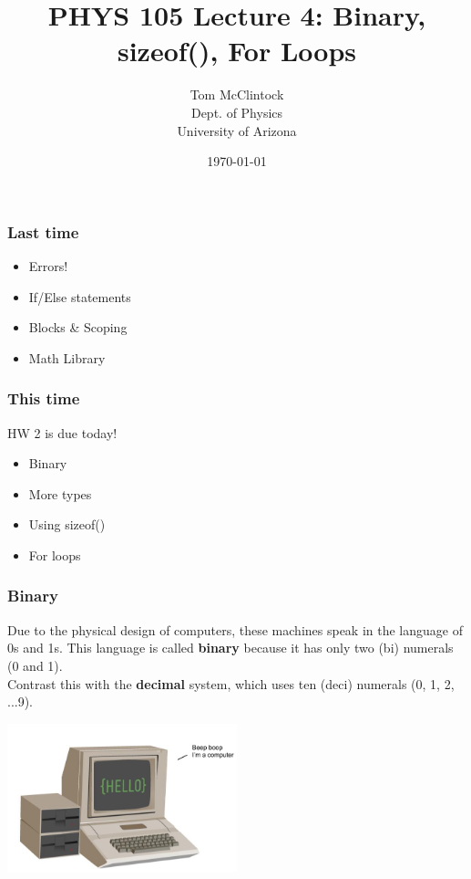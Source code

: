 \documentclass{beamer}
\title{PHYS 105 Lecture 4: Binary, sizeof(), For Loops}
\author{Tom McClintock \\
	Dept. of Physics\\
	University of Arizona
}
\date{\today}
\begin{document}
\begin{frame}
  \titlepage
\end{frame}

\begin{frame}
  \frametitle{Last time}
  \begin{itemize}
    \item Errors!
    \item If/Else statements
    \item Blocks \& Scoping
    \item Math Library
  \end{itemize}
\end{frame}

\begin{frame}
  \frametitle{This time}
  HW 2 is due today!
  \begin{itemize}
    \item Binary
    \item More types
    \item Using sizeof()
    \item For loops
  \end{itemize}
\end{frame}

\begin{frame}
  \frametitle{Binary}
  Due to the physical design of computers, these machines speak in the language of 0s and 1s.
  This language is called \textbf{binary} because it has only two (bi) numerals (0 and 1).\\
  \vspace{12pt}
  Contrast this with the \textbf{decimal} system, which uses ten (deci) numerals (0, 1, 2, ...9).
  \begin{center}
    \includegraphics[width=0.5\textwidth]{beepboop.jpg}
  \end{center}
\end{frame}
\end{document}
